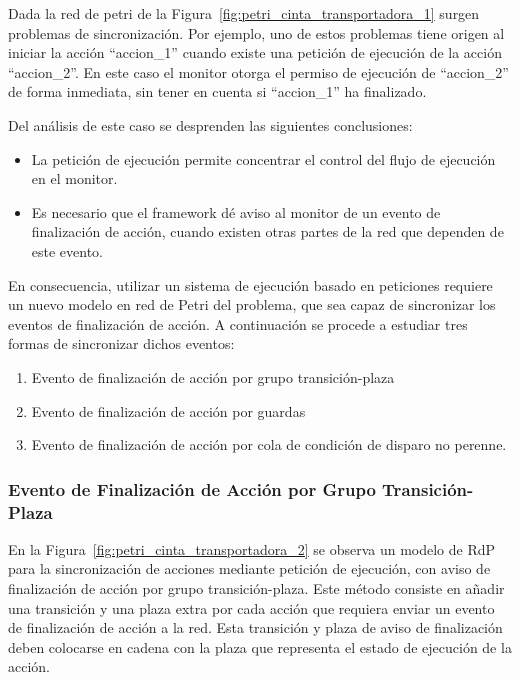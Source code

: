 Dada la red de petri de la Figura~\ref{fig:petri_cinta_transportadora_1}
surgen problemas de sincronización. Por ejemplo, uno de estos problemas
tiene origen al iniciar la acción “accion\_1” cuando existe una petición
de ejecución de la acción “accion\_2”. En este caso el monitor otorga el permiso
de ejecución de “accion\_2” de forma inmediata, sin tener en cuenta si
“accion\_1” ha finalizado.

Del análisis de este caso se desprenden las siguientes conclusiones:
\begin {itemize}
  \item La petición de ejecución permite concentrar el control del flujo de
  	ejecución en el monitor.
  \item Es necesario que el framework dé aviso al
	monitor de un evento de finalización de acción, cuando existen otras partes de
	la red que dependen de este evento.
\end{itemize}

En consecuencia, utilizar un sistema de ejecución basado en peticiones requiere
un nuevo modelo en red de Petri del problema, que sea capaz de sincronizar los
eventos de finalización de acción. A continuación se procede a estudiar tres
formas de sincronizar dichos eventos:
\begin{enumerate}
  \item Evento de finalización de acción por grupo transición-plaza
  \item Evento de finalización de acción por guardas
  \item Evento de finalización de acción por cola de condición de disparo no
  perenne.
\end{enumerate}

\subsubsection{Evento de Finalización de Acción por Grupo
Transición-Plaza}
\label{sec:sincronizacion_peticion_ejecucion_transicion_plaza}
En la Figura~\ref{fig:petri_cinta_transportadora_2} se observa un modelo de
RdP para la sincronización de acciones mediante petición de ejecución, con aviso
de finalización de acción por grupo transición-plaza. Este método consiste en
añadir una transición y una plaza extra por cada acción que
requiera enviar un evento de finalización de acción a la red. Esta transición y
plaza de aviso de finalización deben colocarse en cadena con la plaza que
representa el estado de ejecución de la acción.
\\

